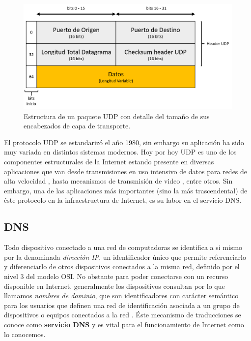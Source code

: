 \begin{figure}[!h]
	\centering
	\includegraphics[scale=.55]{imagenes/estructuraUDP.png}
	\caption{Estructura de un paquete UDP con detalle del tamaño de sus encabezados de capa de transporte.}
	\label{fig:datagramaudp}
\end{figure}

El protocolo UDP se estandarizó el año 1980, sin embargo su aplicación ha sido muy variada en distintos sistemas modernos. Hoy por hoy UDP es uno de los componentes estructurales de la Internet estando presente en diversas aplicaciones que van desde transmisiones en uso intensivo de datos para redes de alta velocidad \cite{udp:highbandwidth}, hasta mecanismos de transmisión de video \cite{udp:video}, entre otros. Sin embargo, una de las aplicaciones más importantes (sino la más trascendental) de éste protocolo en la infraestructura de Internet, es su labor en el servicio DNS.

\subsection{DNS}
Todo dispositivo conectado a una red de computadoras se identifica a si mismo por la denominada \emph{dirección IP}, un identificador único que permite referenciarlo y diferenciarlo de otros dispositivos conectados a la misma red, definido por el nivel 3 del modelo OSI. No obstante para poder conectarse con un recurso disponible en Internet, generalmente los dispositivos consultan por lo que llamamos \emph{nombres de dominio}, que son identificadores con carácter semántico para los usuarios que definen una red de identificación asociada a un grupo de dispositivos o equipos conectados a la red \cite{wiki:nombre_dominio}. Éste mecanismo de traducciones se conoce como \textbf{servicio DNS} y es vital para el funcionamiento de Internet como lo conocemos.


